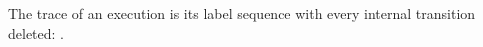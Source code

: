 \begin{definition}[Trace]
  \label{def:trace}
  \leanok
  The trace of an execution is its label sequence with every internal transition deleted: .
\end{definition}
